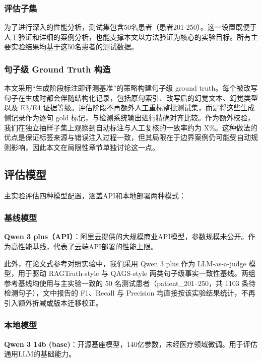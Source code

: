 \documentclass[11pt]{article}
\begin{document}
\subsubsection{评估子集}

为了进行深入的性能分析，测试集包含50名患者（患者201-250）。这一设置既便于人工验证和详细的案例分析，也能支撑本文以方法验证为核心的实验目标。所有主要实验结果均基于这50名患者的测试数据。

\subsubsection{句子级 Ground Truth 构造}

本文采用``生成阶段标注即评测基准''的策略构建句子级 ground truth。每个被改写句子在生成时都会伴随结构化记录，包括原句索引、改写后的幻觉文本、幻觉类型以及 E3/E4 证据等级。评估阶段不再额外人工重标整批测试集，而是将这些生成侧记录作为逐句 gold 标记，与检测系统输出进行精确对齐比较。作为额外校验，我们在独立抽样子集上观察到自动标注与人工复核的一致率约为 X\%。这种做法的优点是保证标签来源与错误注入过程一致，但其局限在于边界案例仍可能受自动规则影响，因此本文在局限性章节单独讨论这一点。

\subsection{评估模型}

主实验评估四种模型配置，涵盖API和本地部署两种模式：

\subsubsection{基线模型}

\textbf{Qwen 3 plus（API）}：阿里云提供的大规模商业API模型，参数规模未公开。作为高性能基线，代表了云端API部署的性能上限。

此外，在论文式参考对照实验中，我们采用 Qwen 3 plus 作为 LLM-as-a-judge 模型，用于驱动 RAGTruth-style 与 QAGS-style 两类句子级事实一致性基线。两组参考基线均使用与主实验一致的 50 名测试患者（patient\_201--250，共 1103 条待检测句子），文中报告的 F1、Recall 与 Precision 均直接按该实验结果统计，不再引入额外折减或版本迁移校正。

\subsubsection{本地模型}

\textbf{Qwen 3 14b (base)}：开源基座模型，140亿参数，未经医疗领域微调。用于评估通用LLM的基础能力。
\end{document}
